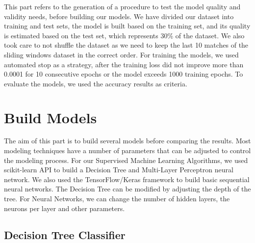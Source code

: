 This part refers to the generation of a procedure to test the model quality and validity needs, before building our models. \newline \newline
We have divided our dataset into training and test sets, the model is built based on the training set, and its quality is estimated based on the test set, which represents 30\% of the dataset. \newline
We also took care to not shuffle the dataset as we need to keep the last 10 matches of the sliding windows dataset in the correct order. \newline \newline
For training the models, we used automated stop as a strategy, after the training loss did not improve more than 0.0001 for 10 consecutive epochs or the model exceeds 1000 training epochs.\newline \newline
To evaluate the models, we used the accuracy results as criteria.


\section{Build Models}

The aim of this part is to build several models before comparing the results.\newline
Most modeling techniques have a number of parameters that can be adjusted to control the modeling process.\newline \newline
For our Supervised Machine Learning Algorithms, we used scikit-learn API to build a Decision Tree and Multi-Layer Perceptron neural network. We also used the TensorFlow/Keras framework to build basic sequential neural networks.\newline \newline
The Decision Tree can be modified by adjusting the depth of the tree. For Neural Networks, we can change the number of hidden layers, the neurons per layer and other parameters.


\subsection{Decision Tree Classifier}

